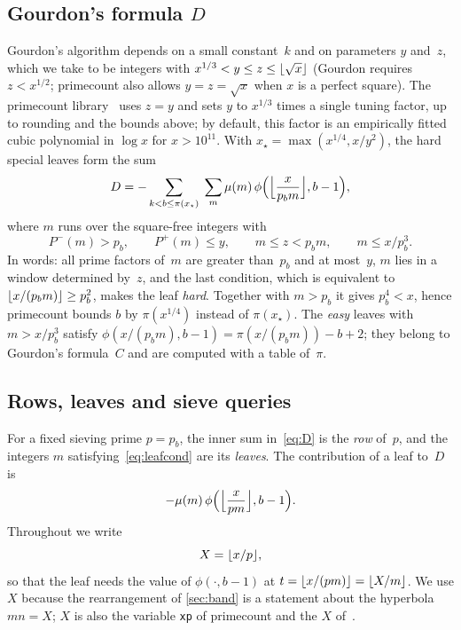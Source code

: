 \documentclass[11pt,a4paper]{amsart}
\numberwithin{equation}{section}
\DeclarePairedDelimiter{\floor}{\lfloor}{\rfloor}
\newcommand{\Pminus}{P^{-}}
\newcommand{\Pplus}{P^{+}}
\begin{document}
\subsection{Gourdon's formula \texorpdfstring{$D$}{D}}\label{sec:gourdonD}
Gourdon's algorithm depends on a small constant~$k$ and on parameters $y$
and~$z$, which we take to be integers with $x^{1/3}<y\le z\le\floor{\sqrt x}$
(Gourdon requires $z<x^{1/2}$; primecount also allows $y=z=\sqrt x$ when $x$ is a
perfect square). The primecount library~\cite{primecount} uses $z=y$ and sets
$y$ to $x^{1/3}$ times a single tuning factor, up to rounding and the bounds
above; by default, this factor is an empirically fitted cubic polynomial in
$\log x$ for $x>10^{11}$. With $x_\star=\max(x^{1/4},x/y^2)$, the hard
special leaves form the sum~\cite[\S2]{Gourdon2001}
\begin{equation}\label{eq:D}
  D=-\sum_{k<b\le\pi(x_\star)}\;\sum_{m}\mu(m)\,
     \phi\Bigl(\Bigl\lfloor\frac{x}{p_b m}\Bigr\rfloor,b-1\Bigr),
\end{equation}
where $m$ runs over the square-free integers with
\begin{equation}\label{eq:leafcond}
  \Pminus(m)>p_b,\qquad \Pplus(m)\le y,\qquad m\le z<p_b m,\qquad m\le x/p_b^3.
\end{equation}
In words: all prime factors of~$m$ are greater than~$p_b$ and at most~$y$,
$m$ lies in a window determined by~$z$, and the last condition, which is
equivalent to $\floor{x/(p_bm)}\ge p_b^2$, makes the leaf \emph{hard}. Together
with $m>p_b$ it gives $p_b^4<x$, hence primecount bounds $b$ by $\pi(x^{1/4})$
instead of $\pi(x_\star)$. The
\emph{easy} leaves with $m>x/p_b^3$ satisfy
$\phi(x/(p_bm),b-1)=\pi(x/(p_bm))-b+2$; they belong to Gourdon's formula~$C$
and are computed with a table of~$\pi$.

\subsection{Rows, leaves and sieve queries}\label{sec:rows}
For a fixed sieving prime $p=p_b$, the inner sum in~\eqref{eq:D} is the
\emph{row} of~$p$, and the integers $m$ satisfying~\eqref{eq:leafcond} are its
\emph{leaves}. The contribution of a leaf to~$D$ is
\begin{equation}\label{eq:leaf}
  -\mu(m)\,\phi\Bigl(\Bigl\lfloor\frac{x}{pm}\Bigr\rfloor,b-1\Bigr).
\end{equation}
Throughout we write
\begin{equation}\label{eq:X}
  X=\floor{x/p},
\end{equation}
so that the leaf needs the value of $\phi(\cdot,b-1)$ at
$t=\floor{x/(pm)}=\floor{X/m}$. We use $X$ because the rearrangement of
\cref{sec:band} is a statement about the hyperbola $mn=X$; $X$ is also the
variable \texttt{xp} of primecount and the $X$ of~\cite{Lin2026}.
\end{document}
